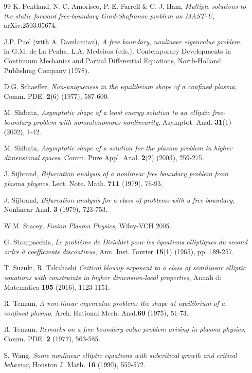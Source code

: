 \documentclass[10pt]{amsart}
\begin{document}
\begin{thebibliography}{99}
 K. Pentland, N. C. Amorisco, P. E. Farrell \& C. J. Ham, {\em Multiple solutions to the static forward free-boundary Grad-Shafranov
problem on MAST-U}, arXiv:2503.05674.

 J.P. Puel (with A. Damlamian), {\em A free boundary, nonlinear eigenvalue problem}, in
G.M. de La Penha, L.A. Medeiros (eds.), Contemporary Developments in Continuum Mechanics and Partial Differential Equations, North-Holland Publishing Company (1978).

D.G. Schaeffer, {\em Non-uniqueness in the equilibrium shape of a confined plasma},
Comm. PDE. {\bf 2}(6) (1977), 587-600.

 M. Shibata, {\em Asymptotic shape of a least energy solution to an elliptic free-boundary problem with nonautonomous nonlinearity},
Asymptot. Anal. {\bf 31}(1) (2002), 1-42.

 M. Shibata, {\em Asymptotic shape of a solution for the plasma problem
in higher dimensional spaces}, Comm. Pure Appl. Anal. {\bf 2}(2) (2003), 259-275.

 J. Sijbrand, {\em Bifurcation analysis of a nonlinear free boundary
problem from plasma physics}, Lect. Note. Math. {\bf 711} (1979), 76-93.

 J. Sijbrand, {\em Bifurcation analysis for a class of problems
with a free boundary}, Nonlinear Anal. {\bf 3} (1979), 723-753.

 W.M. Stacey, {\sl Fusion Plasma Physics}, Wiley-VCH 2005.

 G.  Stampacchia, {\em Le probl{\`e}me de Dirichlet pour les {\'e}quations elliptiques
du second ordre {\`a} coefficients discontinus},
Ann. Inst. Fourier {\bf 15}(1) (1965), pp. 189-257.

 T. Suzuki, R. Takahashi {\em Critical blowup exponent to a class of semilinear elliptic
equations with constraints in higher dimension-local
properties}, Annali di Matematica {\bf 195} (2016), 1123-1151.

 R. Temam, {\em A non-linear eigenvalue problem: the shape at equilibrium of a confined plasma},
Arch. Rational Mech. Anal.{\bf 60} (1975), 51-73.

 R. Temam, {\em Remarks on a free boundary value problem arising in plasma
physics}, Comm. PDE. {\bf 2} (1977), 563-585.

 S. Wang, {\em Some nonlinear elliptic equations with subcritical growth and critical behavior},
Houston J. Math. {\bf 16} (1990), 559-572.


\end{thebibliography}
\end{document}
